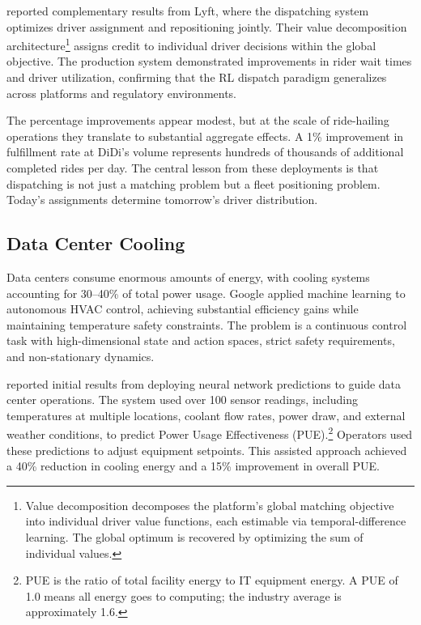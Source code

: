 \citet{Han2022lyft} reported complementary results from Lyft, where the dispatching system optimizes driver assignment and repositioning jointly. Their value decomposition architecture\footnote{Value decomposition decomposes the platform's global matching objective into individual driver value functions, each estimable via temporal-difference learning. The global optimum is recovered by optimizing the sum of individual values.} assigns credit to individual driver decisions within the global objective. The production system demonstrated improvements in rider wait times and driver utilization, confirming that the RL dispatch paradigm generalizes across platforms and regulatory environments.

The percentage improvements appear modest, but at the scale of ride-hailing operations they translate to substantial aggregate effects. A 1\% improvement in fulfillment rate at DiDi's volume represents hundreds of thousands of additional completed rides per day. The central lesson from these deployments is that dispatching is not just a matching problem but a fleet positioning problem. Today's assignments determine tomorrow's driver distribution.


\subsection{Data Center Cooling}
\label{sec:datacenter}

Data centers consume enormous amounts of energy, with cooling systems accounting for 30--40\% of total power usage. Google applied machine learning to autonomous HVAC control, achieving substantial efficiency gains while maintaining temperature safety constraints. The problem is a continuous control task with high-dimensional state and action spaces, strict safety requirements, and non-stationary dynamics.

\citet{Gao2014} reported initial results from deploying neural network predictions to guide data center operations. The system used over 100 sensor readings, including temperatures at multiple locations, coolant flow rates, power draw, and external weather conditions, to predict Power Usage Effectiveness (PUE).\footnote{PUE is the ratio of total facility energy to IT equipment energy. A PUE of 1.0 means all energy goes to computing; the industry average is approximately 1.6.} Operators used these predictions to adjust equipment setpoints. This assisted approach achieved a 40\% reduction in cooling energy and a 15\% improvement in overall PUE.

